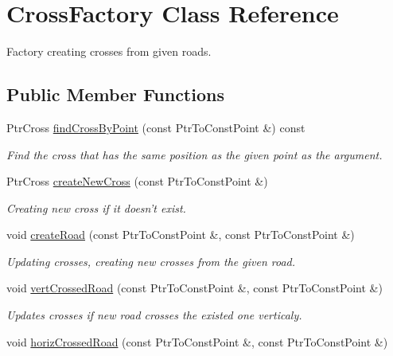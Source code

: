 \hypertarget{classCrossFactory}{\section{Cross\-Factory Class Reference}
\label{classCrossFactory}
}


Factory creating crosses from given roads.  


\subsection*{Public Member Functions}
\begin{DoxyCompactItemize}
\item 
Ptr\-Cross \hyperlink{classCrossFactory_a20b57828696dfc9e8a2f3384d5d29bae}{find\-Cross\-By\-Point} (const Ptr\-To\-Const\-Point \&) const 
\begin{DoxyCompactList}\small\item\em Find the cross that has the same position as the given point as the argument. \end{DoxyCompactList}\item 
Ptr\-Cross \hyperlink{classCrossFactory_accdbbd63f5a76a62269e1dde580b72b7}{create\-New\-Cross} (const Ptr\-To\-Const\-Point \&)
\begin{DoxyCompactList}\small\item\em Creating new cross if it doesn't exist. \end{DoxyCompactList}\item 
void \hyperlink{classCrossFactory_aee15c59ec2656c5cc422a889c30d4581}{create\-Road} (const Ptr\-To\-Const\-Point \&, const Ptr\-To\-Const\-Point \&)
\begin{DoxyCompactList}\small\item\em Updating crosses, creating new crosses from the given road. \end{DoxyCompactList}\item 
void \hyperlink{classCrossFactory_ae8ac0c74d33e41161119e56e9995243e}{vert\-Crossed\-Road} (const Ptr\-To\-Const\-Point \&, const Ptr\-To\-Const\-Point \&)
\begin{DoxyCompactList}\small\item\em Updates crosses if new road crosses the existed one verticaly. \end{DoxyCompactList}\item 
void \hyperlink{classCrossFactory_ae1ea5359b31f09f76510c90e9b4552e5}{horiz\-Crossed\-Road} (const Ptr\-To\-Const\-Point \&, const Ptr\-To\-Const\-Point \&)

\end{DoxyCompactItemize}
